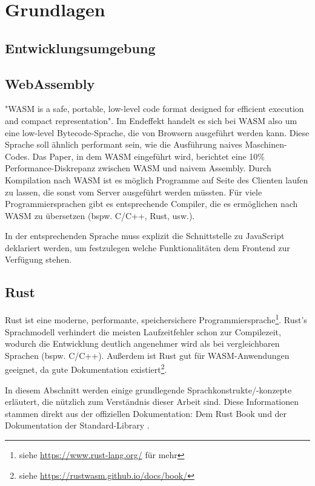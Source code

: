 \chapter{Grundlagen}\label{chap:prereqs}

\section{Entwicklungsumgebung}

\section{WebAssembly}

"\ac{WASM} is a safe, portable, low-level code format designed for efficient execution and compact representation"\cite{WebAssemblyCoreSpecification}. Im Endeffekt handelt es sich bei \ac{WASM} also um eine low-level Bytecode-Sprache, die von Browsern ausgeführt werden kann. Diese Sprache soll ähnlich performant sein, wie die Ausführung naives Maschinen-Codes. Das Paper, in dem \ac{WASM} eingeführt wird, berichtet eine 10\% Performance-Diskrepanz zwischen \ac{WASM} und naivem Assembly\cite{10.1145/3062341.3062363}. Durch Kompilation nach \ac{WASM} ist es möglich Programme auf Seite des Clienten laufen zu lassen, die sonst vom Server ausgeführt werden müssten.
Für viele Programmiersprachen gibt es entsprechende Compiler, die es ermöglichen nach \ac{WASM} zu übersetzen (bspw. C/C++, Rust, usw.).

In der entsprechenden Sprache muss explizit die Schnittstelle zu JavaScript deklariert werden, um festzulegen welche Funktionalitäten dem Frontend zur Verfügung stehen.

\section{Rust}

Rust ist eine moderne, performante, speichersichere Programmiersprache\footnote{siehe \url{https://www.rust-lang.org/} für mehr}. Rust's Sprachmodell verhindert die meisten Laufzeitfehler schon zur Compilezeit, wodurch die Entwicklung deutlich angenehmer wird als bei vergleichbaren Sprachen (bspw. C/C++). Außerdem ist Rust gut für \ac{WASM}-Anwendungen geeignet, da gute Dokumentation existiert\footnote{siehe \url{https://rustwasm.github.io/docs/book/}}.

In diesem Abschnitt werden einige grundlegende Sprachkonstrukte/-konzepte erläutert, die nützlich zum Verständnis dieser Arbeit sind.
Diese Informationen stammen direkt aus der offiziellen Dokumentation: Dem Rust Book \cite{rustBook} und der Dokumentation der Standard-Library \cite{rustDoc}.

